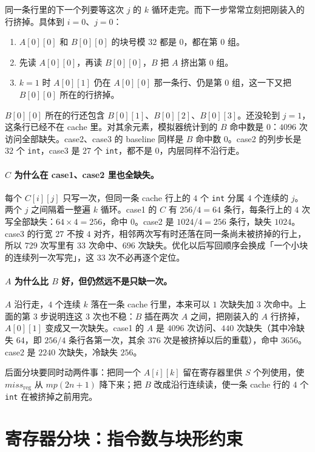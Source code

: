 \documentclass[11pt,a4paper,fontset=fandol]{ctexart}
\newcommand{\code}[1]{\texttt{#1}}
\newcommand{\mreg}{\mathit{miss}_{\mathrm{reg}}}
\begin{document}
同一条行里的下一个列要等这次 $j$ 的 $k$ 循环走完。而下一步常常立刻把刚装入的行挤掉。具体到 $i=0$、$j=0$：
\begin{enumerate}
  \item $A[0][0]$ 和 $B[0][0]$ 的块号模 $32$ 都是 $0$，都在第 $0$ 组。
  \item 先读 $A[0][0]$，再读 $B[0][0]$，$B$ 把 $A$ 挤出第 $0$ 组。
  \item $k=1$ 时 $A[0][1]$ 仍在 $A[0][0]$ 那一条行、仍是第 $0$ 组，这一下又把 $B[0][0]$ 所在的行挤掉。
\end{enumerate}
$B[0][0]$ 所在的行还包含 $B[0][1]$、$B[0][2]$、$B[0][3]$。还没轮到 $j=1$，这条行已经不在 cache 里。对其余元素，模拟器统计到的 $B$ 命中数是 $0$：$4096$ 次访问全部缺失。case2、case3 的 baseline 同样是 $B$ 命中数 $0$。case2 的列步长是 $32$ 个 \code{int}，case3 是 $27$ 个 \code{int}，都不是 $0$，内层同样不沿行走。

\paragraph{$C$ 为什么在 case1、case2 里也全缺失。}
每个 $C[i][j]$ 只写一次，但同一条 cache 行上的 $4$ 个 \code{int} 分属 $4$ 个连续的 $j$。两个 $j$ 之间隔着一整遍 $k$ 循环。case1 的 $C$ 有 $256/4=64$ 条行，每条行上的 $4$ 次写全部缺失：$64\times4=256$，命中 $0$。case2 是 $1024/4=256$ 条行，缺失 $1024$。case3 的行宽 $27$ 不按 $4$ 对齐，相邻两次写有时还落在同一条尚未被挤掉的行上，所以 $729$ 次写里有 $33$ 次命中、$696$ 次缺失。优化以后写回顺序会换成「一个小块的连续列一次写完」，这 $33$ 次不必再逐个定位。

\paragraph{$A$ 为什么比 $B$ 好，但仍然远不是只缺一次。}
$A$ 沿行走，$4$ 个连续 $k$ 落在一条 cache 行里，本来可以 $1$ 次缺失加 $3$ 次命中。上面的第 $3$ 步说明连这 $3$ 次也不稳：$B$ 插在两次 $A$ 之间，把刚装入的 $A$ 行挤掉，$A[0][1]$ 变成又一次缺失。case1 的 $A$ 是 $4096$ 次访问、$440$ 次缺失（其中冷缺失 $64$，即 $256/4$ 条行各第一次，其余 $376$ 次是被挤掉以后的重载），命中 $3656$。case2 是 $2240$ 次缺失，冷缺失 $256$。

后面分块要同时动两件事：把同一个 $A[i][k]$ 留在寄存器里供 $S$ 个列使用，使 $\mreg$ 从 $mp(2n+1)$ 降下来；把 $B$ 改成沿行连续读，使一条 cache 行的 $4$ 个 \code{int} 在被挤掉之前用完。

\section{寄存器分块：指令数与块形约束}
\label{sec:formula}
\end{document}
